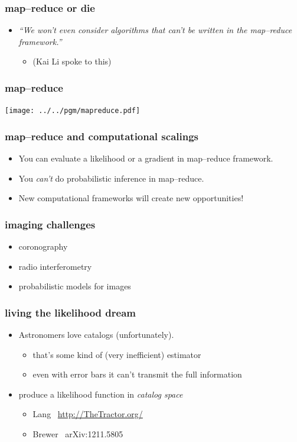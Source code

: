 \documentclass[pdftex]{beamer}
\begin{document}
\begin{frame}
  \frametitle{map--reduce or die}
  \begin{itemize}
  \item \textsl{``We won't even consider algorithms that can't be
    written in the map--reduce framework.''}
    \begin{itemize}
    \item (Kai Li spoke to this)
    \end{itemize}
  \end{itemize}
\end{frame}

\begin{frame}
  \frametitle{map--reduce}
  \texttt{[image: ../../pgm/mapreduce.pdf]}
\end{frame}

\begin{frame}
  \frametitle{map--reduce and computational scalings}
  \begin{itemize}
  \item You can evaluate a likelihood or a gradient in map--reduce framework.
  \item You \emph{can't} do probabilistic inference in map--reduce.
  \item New computational frameworks will create new opportunities!
  \end{itemize}
\end{frame}

\begin{frame}
  \frametitle{imaging challenges}
  \begin{itemize}
  \item coronography
  \item radio interferometry
  \item probabilistic models for images
  \end{itemize}
\end{frame}

\begin{frame}
  \frametitle{living the likelihood dream}
  \begin{itemize}
  \item Astronomers love catalogs (unfortunately).
    \begin{itemize}
    \item that's some kind of (very inefficient) estimator
    \item even with error bars it can't transmit the full information
    \end{itemize}
  \item produce a likelihood function in \emph{catalog space}
    \begin{itemize}
    \item Lang \etal\ \url{http://TheTractor.org/}
    \item Brewer \etal\ arXiv:1211.5805
    \end{itemize}
  \end{itemize}
\end{frame}
\end{document}
